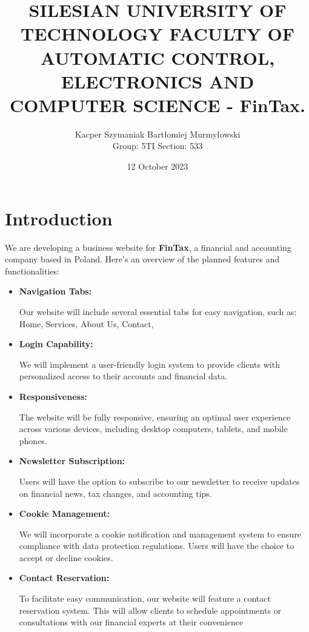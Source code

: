 \documentclass{article}
\title{\textbf{SILESIAN UNIVERSITY OF TECHNOLOGY FACULTY OF AUTOMATIC CONTROL, ELECTRONICS AND COMPUTER SCIENCE - FinTax.
}}
\author{Kacper Szymaniak Bartłomiej Murmyłowski \\
Group: 5TI Section: 533
}
\date{12 October 2023}
\begin{document}
\thispagestyle{empty}
    \maketitle
 \restoregeometry
    \newpage
{}   
\fontsize{14}{16}\selectfont

\tableofcontents

    
    \newpage
    \section{Introduction}
We are developing a business website for \textbf{FinTax}, a financial and accounting company based in Poland. Here's an overview of the planned features and functionalities:
\begin{itemize}
    \item \textbf{Navigation Tabs:} \par
    Our website will include several essential tabs for easy navigation, such as:
Home, Services, About Us, Contact,

    \item \textbf{Login Capability:}\par
We will implement a user-friendly login system to provide clients with personalized access to their accounts and financial data.
\item \textbf{Responsiveness:} \par
The website will be fully responsive, ensuring an optimal user experience across various devices, including desktop computers, tablets, and mobile phones.

\item \textbf{Newsletter Subscription:} \par

Users will have the option to subscribe to our newsletter to receive updates on financial news, tax changes, and accounting tips.

\item \textbf{Cookie Management:} \par
We will incorporate a cookie notification and management system to ensure compliance with data protection regulations. Users will have the choice to accept or decline cookies.

\item \textbf{Contact Reservation:} \par
To facilitate easy communication, our website will feature a contact reservation system. This will allow clients to schedule appointments or consultations with our financial experts at their convenience

\end{itemize}
\end{document}
